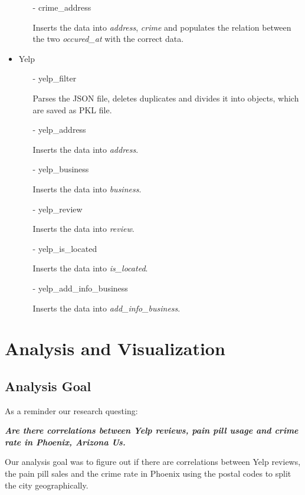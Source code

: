 \begin{itemize}
\begin{itemize}
        \item[-] crime\_address
        \item[] Inserts the data into \textit{address}, \textit{crime} and populates the relation between the two \textit{occured\_at} with the correct data. 
    \end{itemize}
    \item Yelp
    \begin{itemize}
        \item[-] yelp\_filter
        \item[] Parses the JSON file, deletes duplicates and divides it into objects, which are saved as PKL file.
        \item[-] yelp\_address
        \item[] Inserts the data into \textit{address}.  
        \item[-] yelp\_business
        \item[] Inserts the data into \textit{business}.  
        \item[-] yelp\_review
        \item[] Inserts the data into \textit{review}.  
        \item[-] yelp\_is\_located
        \item[] Inserts the data into \textit{is\_located}. 
        \item[-] yelp\_add\_info\_business
        \item[] Inserts the data into \textit{add\_info\_business}.   
    \end{itemize}
\end{itemize}

\section{Analysis and Visualization}

\subsection*{Analysis Goal}
As a reminder our research questing:
\begin{center}
    \textbf{\emph{Are there correlations between Yelp reviews, pain pill usage and crime rate in Phoenix, Arizona Us.}}
\end{center}
Our analysis goal was to figure out if there are correlations between Yelp reviews, the pain pill sales and the crime rate in Phoenix using the postal codes to split the city geographically. 

